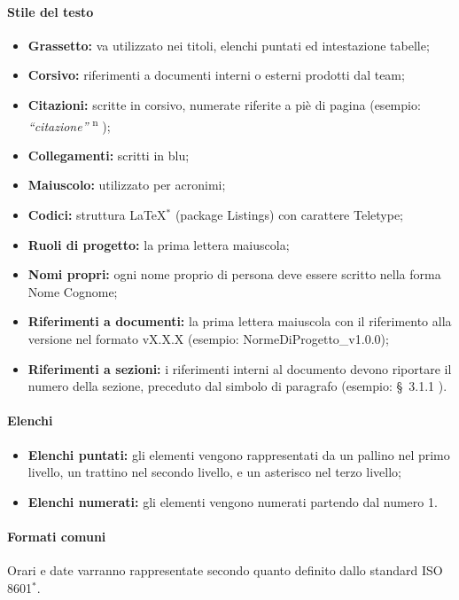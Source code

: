 \documentclass[11pt,a4paper]{article}
\begin{document}
{	\paragraph{Stile del testo}
	\begin{itemize}
		\item \textbf{Grassetto:} va utilizzato nei titoli, elenchi puntati ed intestazione tabelle;
		\item \textbf{Corsivo:} riferimenti a documenti interni o esterni prodotti dal team;
		\item \textbf{Citazioni:} scritte in corsivo, numerate riferite a piè di pagina (esempio: \textit{ ``citazione''} \textsuperscript{n} );
		\item \textbf{Collegamenti:} scritti in blu;
		\item \textbf{Maiuscolo:} utilizzato per acronimi;
		\item \textbf{Codici:} struttura \LaTeX $^*$ (package Listings) con carattere Teletype;
		\item \textbf{Ruoli di progetto:} la prima lettera maiuscola;
		\item \textbf{Nomi propri:} ogni nome proprio di persona deve essere scritto nella forma Nome Cognome;
		\item \textbf{Riferimenti a documenti:} la prima lettera maiuscola con il riferimento alla versione nel formato vX.X.X (esempio: NormeDiProgetto\_v1.0.0);
		\item \textbf{Riferimenti a sezioni:} i riferimenti interni al documento devono riportare il numero della sezione, preceduto dal simbolo di paragrafo (esempio: \S\ {3.1.1} ).
		
	\end{itemize}
	
	
	\paragraph{Elenchi}
	\begin{itemize}
		\item \textbf{Elenchi puntati:} gli elementi vengono rappresentati da un pallino nel primo livello, un trattino nel secondo livello, e un asterisco nel terzo livello; 
		\item \textbf{Elenchi numerati:} gli elementi vengono numerati partendo dal numero 1.
	\end{itemize}
	
	\paragraph{Formati comuni\\}
	Orari e date varranno rappresentate secondo quanto definito dallo standard ISO 8601$^*$. 
	
}
\end{document}
